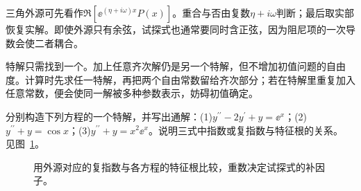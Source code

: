 三角外源可先看作$\Re[\ee^{(\eta+i\omega)x}P(x)]$。重合与否由复数$\eta+i\omega$判断；最后取实部恢复实解。即使外源只有余弦，试探式也通常要同时含正弦，因为阻尼项的一次导数会使二者耦合。

特解只需找到一个。加上任意齐次解仍是另一个特解，但不增加初值问题的自由度。计算时先求任一特解，再把两个自由常数留给齐次部分；若在特解里重复加入任意常数，便会使同一解被多种参数表示，妨碍初值确定。

\begin{example}[特解何时需要乘自变量]\label{ex:c2-e6}
分别构造下列方程的一个特解，并写出通解：(1)$y^{\prime\prime}-2y^{\prime}+y=\ee^x$；(2)$y^{\prime\prime}+y=\cos x$；(3)$y^{\prime\prime}+y=x^2\ee^x$。说明三式中指数或复指数与特征根的关系。 见图~\ref{fig:c2-e6-q}。
\end{example}

\begin{figure}[H]\centering
{}
\caption{用外源对应的复指数与各方程的特征根比较，重数决定试探式的补因子。}\label{fig:c2-e6-q}
\end{figure}
